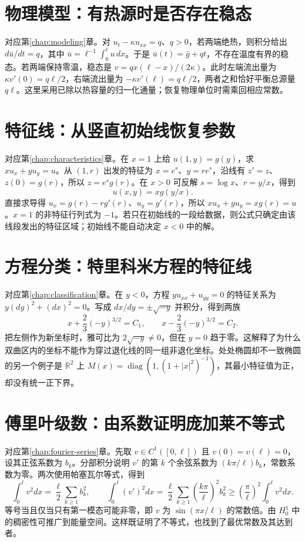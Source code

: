 \documentclass[UTF8,12pt,a4paper,fontset=fandol]{ctexbook}
\begin{document}
\section{物理模型：有热源时是否存在稳态}
对应第\ref{chap:modeling}章。对 $u_t-\kappa u_{xx}=q$、$q>0$，若两端绝热，则积分给出 $d\bar u/dt=q$，其中 $\bar u=\ell^{-1}\int_0^\ell u\,dx$。于是 $\bar u(t)=\bar g+qt$，不存在温度有界的稳态。若两端保持零温，稳态是 $v=q x(\ell-x)/(2\kappa)$。此时左端流出量为 $\kappa v'(0)=q\ell/2$，右端流出量为 $-\kappa v'(\ell)=q\ell/2$，两者之和恰好平衡总源量 $q\ell$。这里采用已除以热容量的归一化通量；恢复物理单位时需乘回相应常数。

\section{特征线：从竖直初始线恢复参数}
对应第\ref{chap:characteristics}章。在 $x=1$ 上给 $u(1,y)=g(y)$，求 $xu_x+yu_y=u$。从 $(1,r)$ 出发的特征为 $x=e^s$、$y=re^s$，沿线有 $z'=z$、$z(0)=g(r)$，所以 $z=e^sg(r)$。在 $x>0$ 可反解 $s=\log x$、$r=y/x$，得到
\[
 u(x,y)=xg(y/x).
\]
直接求导得 $u_x=g(r)-rg'(r)$、$u_y=g'(r)$，所以 $xu_x+yu_y=xg(r)=u$。$x=1$ 的非特征行列式为 $-1$。若只在初始线的一段给数据，则公式只确定由该线段发出的特征区域；初始线不能自动决定 $x<0$ 中的解。

\section{方程分类：特里科米方程的特征线}
对应第\ref{chap:classification}章。在 $y<0$，方程 $yu_{xx}+u_{yy}=0$ 的特征关系为 $y(dy)^2+(dx)^2=0$。写成 $dx/dy=\pm\sqrt{-y}$ 并积分，得到两族
\[
 x+\frac23(-y)^{3/2}=C_1,\qquad
 x-\frac23(-y)^{3/2}=C_2.
\]
把左侧作为新坐标时，雅可比为 $2\sqrt{-y}\ne0$，但在 $y=0$ 趋于零。这解释了为什么双曲区内的坐标不能作为穿过退化线的同一组非退化坐标。处处椭圆却不一致椭圆的另一个例子是 $\mathbb R^2$ 上 $M(x)=\operatorname{diag}(1,(1+|x|^2)^{-1})$，其最小特征值为正，却没有统一正下界。

\section{傅里叶级数：由系数证明庞加莱不等式}
对应第\ref{chap:fourier-series}章。先取 $v\in C^1([0,\ell])$ 且 $v(0)=v(\ell)=0$，设其正弦系数为 $b_k$。分部积分说明 $v'$ 的第 $k$ 个余弦系数为 $(k\pi/\ell)b_k$，常数系数为零。两次使用帕塞瓦尔等式，得到
\[
 \int_0^\ell v^2dx=\frac\ell2\sum_{k\ge1}b_k^2,\qquad
 \int_0^\ell(v')^2dx=\frac\ell2\sum_{k\ge1}\left(\frac{k\pi}{\ell}\right)^2b_k^2
 \ge\left(\frac\pi\ell\right)^2\int_0^\ell v^2dx.
\]
等号当且仅当只有第一模态可能非零，即 $v$ 为 $\sin(\pi x/\ell)$ 的常数倍。由 $H_0^1$ 中的稠密性可推广到能量空间。这样既证明了不等式，也找到了最优常数及其达到者。
\end{document}
